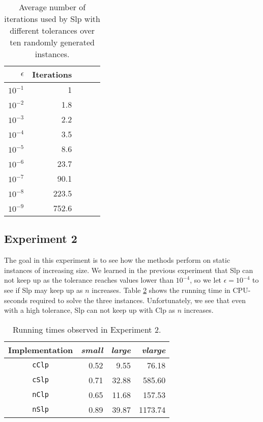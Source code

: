 \begin{table}[ht!]
\centering
\caption{Average number of iterations used by Slp with different tolerances
         over ten randomly generated instances.}
\label{table:expiters}
\begin{tabular}{rrrrr}
$\epsilon$ & Iterations \\ \hline
$10^{-1}$  & 1 \\
$10^{-2}$  & 1.8 \\
$10^{-3}$  & 2.2 \\
$10^{-4}$  & 3.5 \\
$10^{-5}$  & 8.6 \\
$10^{-6}$  & 23.7 \\
$10^{-7}$  & 90.1 \\
$10^{-8}$  & 223.5 \\
$10^{-9}$  & 752.6
\end{tabular}
\end{table}

\subsection*{Experiment 2}
The goal in this experiment is to see how the methods perform on static instances
of increasing size.
We learned in the previous experiment that Slp can not keep up as the tolerance
reaches values lower than $10^{-4}$, so we let $\epsilon = 10^{-4}$ to see if
Slp may keep up as $n$ increases.
Table \ref{table:eps4instances} shows the running time in CPU-seconds required
to solve the three instances.
Unfortunately, we see that even with a high tolerance, Slp can not keep up with Clp
as $n$ increases.

\begin{table}
\centering
\caption{Running times observed in Experiment 2.}
\label{table:eps4instances}
\begin{tabular}{crrr}
\textrm{Implementation} & \textit{small} & \textit{large} & \textit{vlarge} \\ \hline
\texttt{cClp}           & 0.52           & 9.55           & 76.18 \\
\texttt{cSlp}           & 0.71           & 32.88          & 585.60 \\
\texttt{nClp}           & 0.65           & 11.68          & 157.53 \\
\texttt{nSlp}           & 0.89           & 39.87          & 1173.74
\end{tabular}
\end{table}

